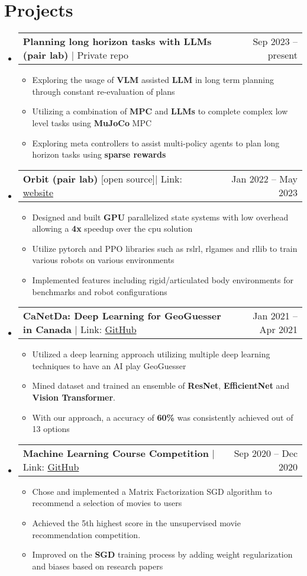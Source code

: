 \documentclass[letterpaper,11pt]{article}
\makeatletter
\newcommand{\resumeItem}[1]{
  \item\small{
    {#1 \vspace{0pt}}
  }
}
\newcommand{\resumeProjectHeading}[2]{
    \item
    \begin{tabular*}{0.97\textwidth}{l@{\extracolsep{\fill}}r}
      \small#1 & #2 \\
    \end{tabular*}\vspace{-5pt}
}
\newcommand{\resumeSubHeadingListStart}{\begin{itemize}[leftmargin=0.15in, label={}]}
\newcommand{\resumeSubHeadingListEnd}{\end{itemize}}
\newcommand{\resumeItemListStart}{\begin{itemize}}
\newcommand{\resumeItemListEnd}{\end{itemize}\vspace{-7pt}}
\makeatother
\begin{document}
\section{Projects}
    \resumeSubHeadingListStart
      \resumeProjectHeading
        {\textbf{Planning long horizon tasks with LLMs (pair lab)} $|$ Private repo}{Sep 2023 -- present}
        \resumeItemListStart
          \resumeItem{Exploring the usage of \textbf{VLM} assisted \textbf{LLM} in long term planning through constant re-evaluation of plans}
          \resumeItem{Utilizing a combination of \textbf{MPC} and \textbf{LLMs} to complete complex low level tasks using \textbf{MuJoCo} MPC}
          \resumeItem{Exploring meta controllers to assist multi-policy agents to plan long horizon tasks using \textbf{sparse rewards}}
        \resumeItemListEnd
      \resumeProjectHeading
        {\textbf{Orbit (pair lab)} [open source]$|$ Link: \href{https://isaac-orbit.github.io/}{website}}{Jan 2022 -- May 2023}
        \resumeItemListStart
          \resumeItem{Designed and built \textbf{GPU} parallelized state systems with low overhead allowing a \textbf{4x} speedup over the cpu solution}
          \resumeItem{Utilize pytorch and PPO libraries such as rslrl, rlgames and rllib to train various robots on various environments}
          \resumeItem{Implemented features including rigid/articulated body environments for benchmarks and robot configurations}
        \resumeItemListEnd
      \resumeProjectHeading
          {\textbf{CaNetDa: Deep Learning for GeoGuesser in Canada} $|$ Link: \href{https://github.com/st-tran/CSC413-Project}{GitHub}}{Jan 2021 -- Apr 2021}
          \resumeItemListStart
            \resumeItem{Utilized a deep learning approach utilizing multiple deep learning techniques to have an AI play GeoGuesser}
            \resumeItem{Mined dataset and trained an ensemble of \textbf{ResNet}, \textbf{EfficientNet} and \textbf{Vision Transformer}.}
            \resumeItem{With our approach, a accuracy of \textbf{60\%} was consistently achieved out of 13 options}
          \resumeItemListEnd
      \resumeProjectHeading
          {\textbf{Machine Learning Course Competition} $|$ Link: \href{https://github.com/JaLnYn/csc311_final_project/tree/main/project/starter_code}{GitHub}}{Sep 2020 -- Dec 2020}
          \resumeItemListStart
            \resumeItem{Chose and implemented a Matrix Factorization SGD algorithm to recommend a selection of movies to users}
            \resumeItem{Achieved the 5th highest score in the unsupervised movie recommendation competition.}
            \resumeItem{Improved on the \textbf{SGD} training process by adding weight regularization and biases based on research papers}
          \resumeItemListEnd
    \resumeSubHeadingListEnd
    
\end{document}

